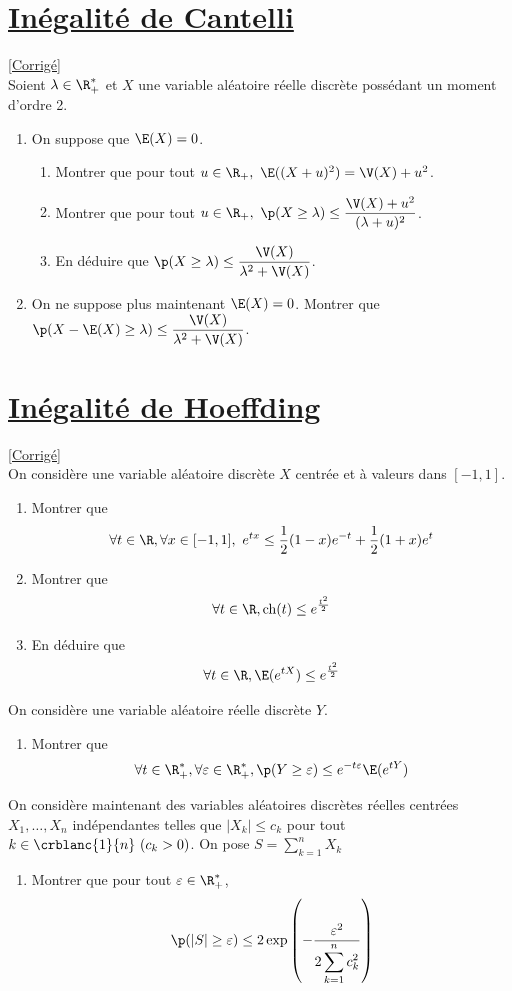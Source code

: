 \documentclass[8pt]{book}
\begin{document}
\section{\underline{Inégalité de Cantelli} }
\label{Inégalité de Cantelli}
\textcolor{blue}{\hyperref[Inégalité de Cantelli corrigé]{[Corrigé]}}\\
Soient $\lambda\in\R^*_+$ et $X$ une variable aléatoire réelle discrète possédant un moment d'ordre 2.
\begin{enumerate}
	\item On suppose que $\E(X)=0$.
	\begin{enumerate}
		\item Montrer que pour tout $u\in\R_+,\ \E((X+u)^2)=\V(X)+u^2$.
		\item Montrer que pour tout $u\in\R_+,\ \p(X\geq \lambda)\leq \displaystyle\frac{\V(X)+u^2}{(\lambda+u)^2}$.
		\item En déduire que $\p(X\geq \lambda)\leq\displaystyle\frac{\V(X)}{\lambda^2+\V(X)}$.
	\end{enumerate}
	\item On ne suppose plus maintenant $\E(X)=0$. Montrer que $\p(X-\E(X)\geq \lambda)\leq \displaystyle\frac{\V(X)}{\lambda^2+\V(X)}$.
\end{enumerate}

\section{\underline{Inégalité de Hoeffding} }
\label{Inégalité de Hoeffding}
\textcolor{blue}{\hyperref[Inégalité de Hoeffding corrigé]{[Corrigé]}}\\
On considère une variable aléatoire discrète $X$ centrée et à valeurs dans $[-1,1]$.
\begin{enumerate}
	\item Montrer que $$\forall t\in\R,\forall x\in[-1,1],\ e^{tx}\leq \frac{1}{2}(1-x)e^{-t}+\frac{1}{2}(1+x)e^t$$
	\item Montrer que $$\forall t\in\R, \operatorname{ch}(t)\leq e^{\frac{t^2}{2}}$$
	\item En déduire que $$\forall t\in\R, \E(e^{tX})\leq e^{\frac{t^2}{2}}$$
\end{enumerate}
On considère une variable aléatoire réelle discrète $Y$.
\begin{enumerate}[resume]
	\item Montrer que $$\forall t\in \R^*_+, \forall \varepsilon\in\R^*_+, \p(Y\geq\varepsilon)\leq e^{-t \varepsilon}\E(e^{tY})$$
\end{enumerate}
On considère maintenant des variables aléatoires discrètes réelles centrées $X_1,\dots, X_n$ indépendantes telles que $|X_k|\leq c_k$ pour tout $k\in\crblanc{1}{n} \ (c_k>0)$. On pose $S=\displaystyle\sum\limits_{k=1}^n X_k$
\begin{enumerate}[resume]
	\item Montrer que pour tout $\varepsilon\in\R^*_+$, $$\p(|S|\geq\varepsilon)\leq 2\exp\left(-\frac{\varepsilon^2}{2\displaystyle\sum\limits_{k=1}^nc_k^2}\right)$$
\end{enumerate}
\end{document}

